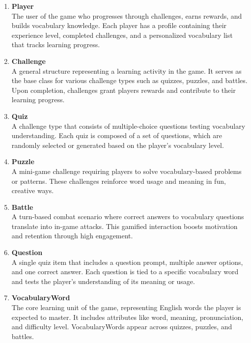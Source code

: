 \begin{enumerate}
    \item \textbf{Player}\\
    The user of the game who progresses through challenges, earns rewards, and builds vocabulary knowledge. 
    Each player has a profile containing their experience level, completed challenges, and a personalized vocabulary list that tracks learning progress.

    \item \textbf{Challenge}\\
    A general structure representing a learning activity in the game. 
    It serves as the base class for various challenge types such as quizzes, puzzles, and battles. 
    Upon completion, challenges grant players rewards and contribute to their learning progress.

    \item \textbf{Quiz}\\
    A challenge type that consists of multiple-choice questions testing vocabulary understanding. 
    Each quiz is composed of a set of questions, which are randomly selected or generated based on the player's vocabulary level.

    \item \textbf{Puzzle}\\
    A mini-game challenge requiring players to solve vocabulary-based problems or patterns. 
    These challenges reinforce word usage and meaning in fun, creative ways.

    \item \textbf{Battle}\\
    A turn-based combat scenario where correct answers to vocabulary questions translate into in-game attacks. 
    This gamified interaction boosts motivation and retention through high engagement.

    \clearpage

    \item \textbf{Question}\\
    A single quiz item that includes a question prompt, multiple answer options, and one correct answer. 
    Each question is tied to a specific vocabulary word and tests the player's understanding of its meaning or usage.

    \item \textbf{VocabularyWord}\\
    The core learning unit of the game, representing English words the player is expected to master. 
    It includes attributes like word, meaning, pronunciation, and difficulty level. 
    VocabularyWords appear across quizzes, puzzles, and battles.


\end{enumerate}
